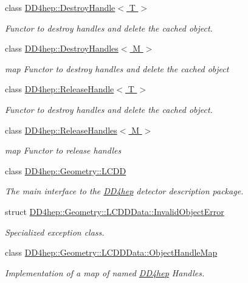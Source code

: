 \begin{DoxyCompactItemize}
class \hyperlink{class_d_d4hep_1_1_destroy_handle}{D\+D4hep\+::\+Destroy\+Handle$<$ T $>$}
\begin{DoxyCompactList}\small\item\em Functor to destroy handles and delete the cached object. \end{DoxyCompactList}\item 
class \hyperlink{class_d_d4hep_1_1_destroy_handles}{D\+D4hep\+::\+Destroy\+Handles$<$ M $>$}
\begin{DoxyCompactList}\small\item\em map Functor to destroy handles and delete the cached object \end{DoxyCompactList}\item 
class \hyperlink{class_d_d4hep_1_1_release_handle}{D\+D4hep\+::\+Release\+Handle$<$ T $>$}
\begin{DoxyCompactList}\small\item\em Functor to destroy handles and delete the cached object. \end{DoxyCompactList}\item 
class \hyperlink{class_d_d4hep_1_1_release_handles}{D\+D4hep\+::\+Release\+Handles$<$ M $>$}
\begin{DoxyCompactList}\small\item\em map Functor to release handles \end{DoxyCompactList}\item 
class \hyperlink{class_d_d4hep_1_1_geometry_1_1_l_c_d_d}{D\+D4hep\+::\+Geometry\+::\+L\+C\+DD}
\begin{DoxyCompactList}\small\item\em The main interface to the \hyperlink{namespace_d_d4hep}{D\+D4hep} detector description package. \end{DoxyCompactList}\item 
struct \hyperlink{struct_d_d4hep_1_1_geometry_1_1_l_c_d_d_data_1_1_invalid_object_error}{D\+D4hep\+::\+Geometry\+::\+L\+C\+D\+D\+Data\+::\+Invalid\+Object\+Error}
\begin{DoxyCompactList}\small\item\em Specialized exception class. \end{DoxyCompactList}\item 
class \hyperlink{class_d_d4hep_1_1_geometry_1_1_l_c_d_d_data_1_1_object_handle_map}{D\+D4hep\+::\+Geometry\+::\+L\+C\+D\+D\+Data\+::\+Object\+Handle\+Map}
\begin{DoxyCompactList}\small\item\em Implementation of a map of named \hyperlink{namespace_d_d4hep}{D\+D4hep} Handles. \end{DoxyCompactList}\item 

\end{DoxyCompactItemize}
